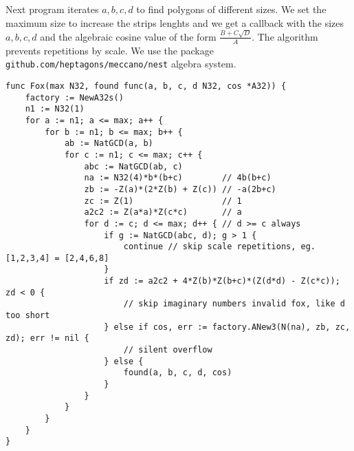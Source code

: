 \documentclass[11pt]{article}
\begin{document}
Next program iterates $a,b,c,d$ to find polygons of different sizes.
We set the maximum size to increase the strips lenghts and we get a callback with the
sizes $a,b,c,d$ and the algebraic cosine value of the form $\frac{B+C\sqrt{D}}{A}$. The algorithm prevents repetitions
by scale. We use the package \texttt{github.com/heptagons/meccano/nest} algebra system.
\begin{lstlisting}
func Fox(max N32, found func(a, b, c, d N32, cos *A32)) {
	factory := NewA32s()
	n1 := N32(1)
	for a := n1; a <= max; a++ {
		for b := n1; b <= max; b++ {
			ab := NatGCD(a, b)
			for c := n1; c <= max; c++ {
				abc := NatGCD(ab, c)
				na := N32(4)*b*(b+c)        // 4b(b+c)
				zb := -Z(a)*(2*Z(b) + Z(c)) // -a(2b+c)
				zc := Z(1)                  // 1
				a2c2 := Z(a*a)*Z(c*c)       // a
				for d := c; d <= max; d++ { // d >= c always
					if g := NatGCD(abc, d); g > 1 {
						continue // skip scale repetitions, eg. [1,2,3,4] = [2,4,6,8]
					}
					if zd := a2c2 + 4*Z(b)*Z(b+c)*(Z(d*d) - Z(c*c)); zd < 0 {
						// skip imaginary numbers invalid fox, like d too short
					} else if cos, err := factory.ANew3(N(na), zb, zc, zd); err != nil {
						// silent overflow
					} else {
						found(a, b, c, d, cos)
					}
				}
			}
		}
	}
}
\end{lstlisting}

\newcommand{\foxface}[6]{ %
 \begin{tikzpicture}
 \def\a{#3};\def\b{#4};\def\c{#5};\def\d{#6};\def\bc{#4+#5}
 \pgfmathsetmacro\max{max(#3,#4+#5)} %
 \pgfmathsetmacro\aA{-1.0*#3*(2.0*#4+#5)}
 \pgfmathsetmacro\aB{pow(#3,2)*pow(#5,2) + 4.0*#4*(#4+#5)*(pow(#6,2)-pow(#5,2)}
 \pgfmathsetmacro\aC{\aA + sqrt(\aB))/(4.0*#4*(#4+#5))}
 \pgfmathsetmacro\angleA{acos(\aC)}
 \pgfmathsetmacro\angleB{acos((pow(#5,2) + pow(#6,2) - pow(#3+2.0*#4*\aC,2))/(2.0*#5*#6))}
 \begin{scope}
  \meccanostrip[0000FF]{\a}{#1}{#2} %
 \end{scope}
 \begin{scope}[shift={(#1*\a,0)},rotate=\angleA]
  \meccanostrip[00FF00]{\max}{#1}{#2} %
  \begin{scope}[shift={(#1*\bc,0)},rotate=180-\angleB]
   \meccanostrip[FF0000]{\d}{#1}{#2}; %
  \end{scope}
 \end{scope}
 \begin{scope}[rotate=180-\angleA]
  \meccanostrip[00FF00]{\max}{#1}{#2} %
  \begin{scope}[shift={(#1*\bc,0)},rotate=\angleB-180]
   \meccanostrip[FF0000]{\d}{#1}{#2}; %
  \end{scope}
 \end{scope}
 \end{tikzpicture}
}
\end{document}
